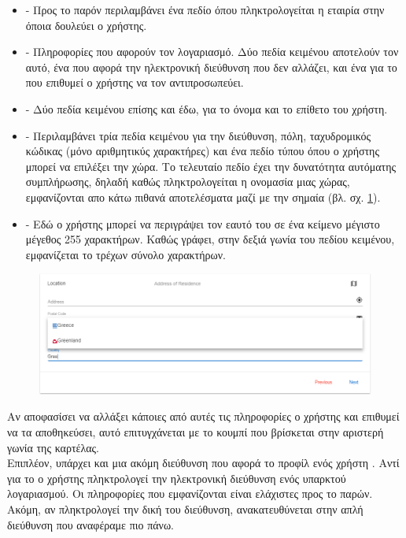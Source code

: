 \begin{itemize}
	\item {} - Προς το παρόν περιλαμβάνει ένα πεδίο όπου πληκτρολογείται η εταιρία στην όποια δουλεύει ο χρήστης.
	\item {} - Πληροφορίες που αφορούν τον λογαριασμό. Δύο πεδία κειμένου αποτελούν τον  αυτό, ένα που αφορά την ηλεκτρονική διεύθυνση που δεν αλλάζει, και ένα για το  που επιθυμεί ο χρήστης να τον αντιπροσωπεύει.
	\item {} - Δύο πεδία κειμένου επίσης και έδω, για το όνομα και το επίθετο του χρήστη.
	\item {} - Περιλαμβάνει τρία πεδία κειμένου για την διεύθυνση, πόλη, ταχυδρομικός κώδικας (μόνο αριθμητικύς χαρακτήρες) και ένα πεδίο τύπου  όπου ο χρήστης μπορεί να επιλέξει την χώρα. Το τελευταίο πεδίο έχει την δυνατότητα αυτόματης συμπλήρωσης, δηλαδή καθώς πληκτρολογείται η ονομασία μιας χώρας, εμφανίζονται απο κάτω πιθανά αποτελέσματα μαζί με την σημαία (βλ. σχ. \ref{fig:userProfileCountry}).
	\item {} - Εδώ ο χρήστης μπορεί να περιγράψει τον εαυτό του σε ένα κείμενο μέγιστο μέγεθος 255 χαρακτήρων. Καθώς γράφει, στην δεξιά γωνία του πεδίου κειμένου, εμφανίζεται το τρέχων σύνολο χαρακτήρων.
\end{itemize}

\begin{figure}[!htb]
\includegraphics[width=\columnwidth, scale=4]{images/userProfileCountry.png}
\caption{}
\label{fig:userProfileCountry}
\end{figure}

\pSpace Αν αποφασίσει να αλλάξει κάποιες από αυτές τις πληροφορίες ο χρήστης και επιθυμεί να τα αποθηκεύσει, αυτό επιτυγχάνεται με το κουμπί που βρίσκεται στην αριστερή γωνία της καρτέλας.\\
\pSpace Επιπλέον, υπάρχει και μια ακόμη διεύθυνση που αφορά το προφίλ ενός χρήστη . Αντί για το  ο χρήστης πληκτρολογεί την ηλεκτρονική διεύθυνση ενός υπαρκτού λογαριασμού. Οι πληροφορίες που εμφανίζονται είναι ελάχιστες προς το παρών. Ακόμη, αν πληκτρολογεί την δική του διεύθυνση, ανακατευθύνεται στην απλή διεύθυνση που αναφέραμε πιο πάνω.

